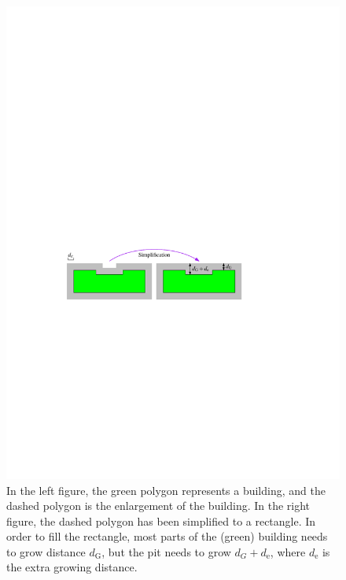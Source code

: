 \documentclass[graybox]{svmult}
\begin{document}
\begin{figure}[tb]
	\centering
	\includegraphics{ExtraGrowth}
	\caption{In the left figure, the green polygon represents a building, and 
	the dashed polygon is the enlargement of the building. In the right 
	figure, the dashed polygon has been simplified to a rectangle. In order to 
	fill the rectangle, most parts of the (green) building needs to grow 
	distance $d_\mathrm{G}$, but the pit needs to grow $d_G + d_\mathrm{e}$, 
	where $d_\mathrm{e}$ is the extra growing distance.}
	\label{fig:ExtraGrowth}
\end{figure}
\end{document}
